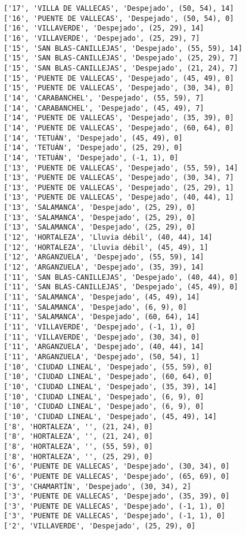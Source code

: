 \documentclass[11pt]{article}
\begin{document}
\begin{Verbatim}[commandchars=\\\{\}]
['17', 'VILLA DE VALLECAS', 'Despejado', (50, 54), 14]
['16', 'PUENTE DE VALLECAS', 'Despejado', (50, 54), 0]
['16', 'VILLAVERDE', 'Despejado', (25, 29), 14]
['16', 'VILLAVERDE', 'Despejado', (25, 29), 7]
['15', 'SAN BLAS-CANILLEJAS', 'Despejado', (55, 59), 14]
['15', 'SAN BLAS-CANILLEJAS', 'Despejado', (25, 29), 7]
['15', 'SAN BLAS-CANILLEJAS', 'Despejado', (21, 24), 7]
['15', 'PUENTE DE VALLECAS', 'Despejado', (45, 49), 0]
['15', 'PUENTE DE VALLECAS', 'Despejado', (30, 34), 0]
['14', 'CARABANCHEL', 'Despejado', (55, 59), 7]
['14', 'CARABANCHEL', 'Despejado', (45, 49), 7]
['14', 'PUENTE DE VALLECAS', 'Despejado', (35, 39), 0]
['14', 'PUENTE DE VALLECAS', 'Despejado', (60, 64), 0]
['14', 'TETUÁN', 'Despejado', (45, 49), 0]
['14', 'TETUÁN', 'Despejado', (25, 29), 0]
['14', 'TETUÁN', 'Despejado', (-1, 1), 0]
['13', 'PUENTE DE VALLECAS', 'Despejado', (55, 59), 14]
['13', 'PUENTE DE VALLECAS', 'Despejado', (30, 34), 7]
['13', 'PUENTE DE VALLECAS', 'Despejado', (25, 29), 1]
['13', 'PUENTE DE VALLECAS', 'Despejado', (40, 44), 1]
['13', 'SALAMANCA', 'Despejado', (25, 29), 0]
['13', 'SALAMANCA', 'Despejado', (25, 29), 0]
['13', 'SALAMANCA', 'Despejado', (25, 29), 0]
['12', 'HORTALEZA', 'Lluvia débil', (40, 44), 14]
['12', 'HORTALEZA', 'Lluvia débil', (45, 49), 1]
['12', 'ARGANZUELA', 'Despejado', (55, 59), 14]
['12', 'ARGANZUELA', 'Despejado', (35, 39), 14]
['11', 'SAN BLAS-CANILLEJAS', 'Despejado', (40, 44), 0]
['11', 'SAN BLAS-CANILLEJAS', 'Despejado', (45, 49), 0]
['11', 'SALAMANCA', 'Despejado', (45, 49), 14]
['11', 'SALAMANCA', 'Despejado', (6, 9), 0]
['11', 'SALAMANCA', 'Despejado', (60, 64), 14]
['11', 'VILLAVERDE', 'Despejado', (-1, 1), 0]
['11', 'VILLAVERDE', 'Despejado', (30, 34), 0]
['11', 'ARGANZUELA', 'Despejado', (40, 44), 14]
['11', 'ARGANZUELA', 'Despejado', (50, 54), 1]
['10', 'CIUDAD LINEAL', 'Despejado', (55, 59), 0]
['10', 'CIUDAD LINEAL', 'Despejado', (60, 64), 0]
['10', 'CIUDAD LINEAL', 'Despejado', (35, 39), 14]
['10', 'CIUDAD LINEAL', 'Despejado', (6, 9), 0]
['10', 'CIUDAD LINEAL', 'Despejado', (6, 9), 0]
['10', 'CIUDAD LINEAL', 'Despejado', (45, 49), 14]
['8', 'HORTALEZA', '', (21, 24), 0]
['8', 'HORTALEZA', '', (21, 24), 0]
['8', 'HORTALEZA', '', (55, 59), 0]
['8', 'HORTALEZA', '', (25, 29), 0]
['6', 'PUENTE DE VALLECAS', 'Despejado', (30, 34), 0]
['6', 'PUENTE DE VALLECAS', 'Despejado', (65, 69), 0]
['3', 'CHAMARTÍN', 'Despejado', (30, 34), 2]
['3', 'PUENTE DE VALLECAS', 'Despejado', (35, 39), 0]
['3', 'PUENTE DE VALLECAS', 'Despejado', (-1, 1), 0]
['3', 'PUENTE DE VALLECAS', 'Despejado', (-1, 1), 0]
['2', 'VILLAVERDE', 'Despejado', (25, 29), 0]

\end{Verbatim}
\end{document}
